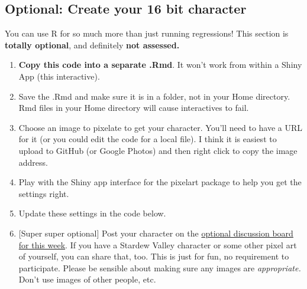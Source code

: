 \documentclass[
  openany]{book}
\providecommand{\tightlist}{%
  \setlength{\itemsep}{0pt}\setlength{\parskip}{0pt}}
\begin{document}
\hypertarget{optional-create-your-16-bit-character}{%
\subsection{Optional: Create your 16 bit character}\label{optional-create-your-16-bit-character}}

You can use R for so much more than just running regressions! This section is \textbf{totally optional}, and definitely \textbf{not assessed.}

\begin{enumerate}
\def\labelenumi{\arabic{enumi}.}
\tightlist
\item
  \textbf{Copy this code into a separate .Rmd}. It won't work from within a Shiny App (this interactive).\\
\item
  Save the .Rmd and make sure it is in a folder, not in your Home directory. Rmd files in your Home directory will cause interactives to fail.
\item
  Choose an image to pixelate to get your character. You'll need to have a URL for it (or you could edit the code for a local file). I think it is easiest to upload to GitHub (or Google Photos) and then right click to copy the image address.
\item
  Play with the Shiny app interface for the pixelart package to help you get the settings right.
\item
  Update these settings in the code below.
\item
  {[}Super super optional{]} Post your character on the \href{https://q.utoronto.ca/courses/253305/discussion_topics/1616645}{optional discussion board for this week}. If you have a Stardew Valley character or some other pixel art of yourself, you can share that, too. This is just for fun, no requirement to participate. Please be sensible about making sure any images are \emph{appropriate.} Don't use images of other people, etc.
\end{enumerate}
\end{document}
